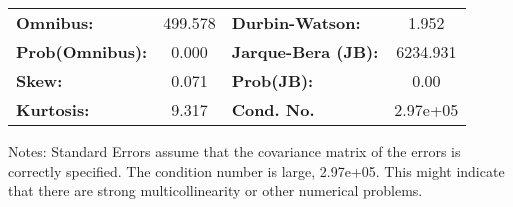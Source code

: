 \begin{center}
\begin{tabular}{lcccccc}
\bottomrule
\end{tabular}
\begin{tabular}{lclc}
\textbf{Omnibus:}       & 499.578 & \textbf{  Durbin-Watson:     } &    1.952  \\
\textbf{Prob(Omnibus):} &   0.000 & \textbf{  Jarque-Bera (JB):  } & 6234.931  \\
\textbf{Skew:}          &   0.071 & \textbf{  Prob(JB):          } &     0.00  \\
\textbf{Kurtosis:}      &   9.317 & \textbf{  Cond. No.          } & 2.97e+05  \\
\bottomrule
\end{tabular}
\end{center}

Notes: \newline
 [1] Standard Errors assume that the covariance matrix of the errors is correctly specified. \newline
 [2] The condition number is large, 2.97e+05. This might indicate that there are \newline
 strong multicollinearity or other numerical problems.